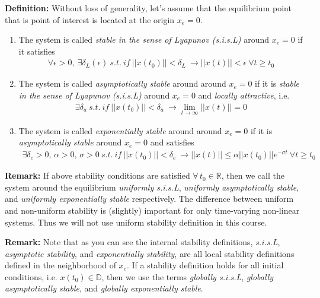 \documentclass[twoside]{article}
\begin{document}
\textbf{Definition:} Without loss of generality, let's assume that the equilibrium point that is point of interest is located at the origin $x_e = 0$.
%
\begin{enumerate}
%
\item The system is called \textit{stable in the sense of Lyapunov (s.i.s.L)} around $x_e = 0$ if it satisfies
%
\begin{align*}
	\forall \epsilon > 0 , \ \exists \delta_L(\epsilon) \ s.t. \ if \ || x(t_0) || < \delta_L \ \rightarrow || x(t) || < \epsilon \ \forall t \geq t_0
\end{align*}
%
\item The system is called \textit{asymptotically stable} around  around $x_e = 0$ if it is 
\textit{stable in the sense of Lyapunov (s.i.s.L)} around $x_e = 0$ and \textit{locally attractive}, i.e.
%
\begin{align*}
	\exists \delta_a \ s.t. \ if \ || x(t_0) || < \delta_a \ \rightarrow \lim_{t \to \infty} || x(t) || = 0
\end{align*}
%
\item The system is called \textit{exponentially stable} around  around $x_e = 0$ if it is 
\textit{asymptotically stable} around $x_e = 0$ and satisfies 
%
\begin{align*}
	\exists \delta_e > 0 , \, \alpha > 0 , \, \sigma >0 \ s.t. \ if \ || x(t_0) || < \delta_e \ \rightarrow || x(t) || \leq \alpha || x(t_0) || e^{- \sigma t} \ \forall t \geq t_0
\end{align*}
%
\end{enumerate}

\textbf{Remark:} If above stability conditions are satisfied $\forall \, t_0 \in \mathbb{R}$, then we call the system around the equilibrium \textit{uniformly s.i.s.L}, 
\textit{uniformly asymptotically stable}, and \textit{uniformly exponentially stable} respectively. The difference between uniform and non-uniform
stability is (slightly) important for only time-varying non-linear systems. Thus we will not use uniform stability definition in this course. 

\textbf{Remark:} Note that as you can see the internal stability
definitions, \textit{s.i.s.L}, \textit{asymptotic stability}, and
\textit{exponentially stability}, are all local stability definitions
defined in the neighborhood of $x_e$. If a stability definition holds
for all initial conditions, i.e. $x(t_0) \in \mathbb{D}$, then we use the terms
\textit{globally s.i.s.L}, \textit{globally asymptotically stable}, and \textit{globally exponentially stable}.
\end{document}
